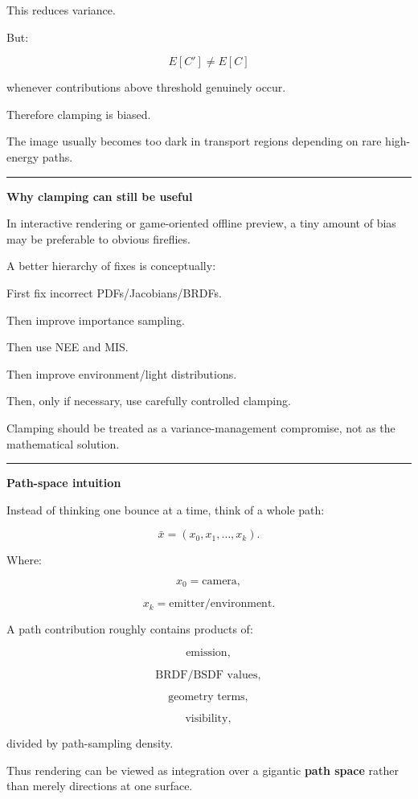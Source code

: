 This reduces variance.

But:

\[
E[C']\neq E[C]
\]

whenever contributions above threshold genuinely occur.

Therefore clamping is biased.

The image usually becomes too dark in transport regions depending on rare high-energy paths.

\begin{center}\rule{0.5\linewidth}{0.5pt}\end{center}

\textbf{Why clamping can still be useful}

In interactive rendering or game-oriented offline preview, a tiny amount of bias may be preferable to obvious fireflies.

A better hierarchy of fixes is conceptually:

First fix incorrect PDFs/Jacobians/BRDFs.

Then improve importance sampling.

Then use NEE and MIS.

Then improve environment/light distributions.

Then, only if necessary, use carefully controlled clamping.

Clamping should be treated as a variance-management compromise, not as the mathematical solution.

\begin{center}\rule{0.5\linewidth}{0.5pt}\end{center}

\textbf{Path-space intuition}

Instead of thinking one bounce at a time, think of a whole path:

\[
\boxed{
\bar x
=
(x_0,x_1,\dots,x_k).
}
\]

Where:

\[
x_0=\text{camera},
\]

\[
x_k=\text{emitter/environment}.
\]

A path contribution roughly contains products of:

\[
\text{emission},
\]

\[
\text{BRDF/BSDF values},
\]

\[
\text{geometry terms},
\]

\[
\text{visibility},
\]

divided by path-sampling density.

Thus rendering can be viewed as integration over a gigantic \textbf{path space} rather than merely directions at one surface.

